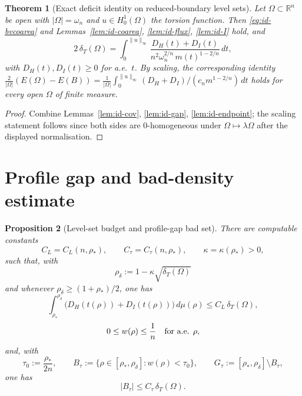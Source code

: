 \documentclass[11pt]{amsart}
\newtheorem{theorem}{Theorem}[section]
\newtheorem{proposition}[theorem]{Proposition}
\theoremstyle{definition}
\newcommand{\R}{\mathbb R}
\newcommand{\Om}{\Omega}
\newcommand{\dT}{\delta_T}
\newcommand{\rstar}{\rho_*}
\newcommand{\rdel}{\rho_\delta}
\newcommand{\wt}{w}
\begin{document}
\begin{theorem}[Exact deficit identity on reduced-boundary level sets]
\label{thm:id-main}
Let \(\Om\subset\R^n\) be open with \(|\Om|=\omega_n\) and \(u\in H^1_0(\Om)\)
the torsion function.  Then \eqref{eq:id-bvcoarea} and
Lemmas~\ref{lem:id-coarea}, \ref{lem:id-flux}, \ref{lem:id-I} hold, and
\begin{equation}\label{eq:id-main}
   \boxed{\;
   2\,\dT(\Om)
   =\int_0^{\|u\|_\infty}
      \frac{D_H(t)+D_I(t)}{n^2\omega_n^{2/n}\,m(t)^{1-2/n}}\,dt ,\;}
\end{equation}
with \(D_H(t),D_I(t)\ge0\) for a.e.\ \(t\).  By scaling, the corresponding
identity \(\tfrac{2}{|\Om|}(E(\Om)-E(B))=\tfrac1{|\Om|}\int_0^{\|u\|_\infty}
(D_H+D_I)/(c_n m^{1-2/n})\,dt\) holds for every open \(\Om\) of finite measure.
\end{theorem}

\begin{proof}
Combine Lemmas~\ref{lem:id-cov}, \ref{lem:id-gap}, \ref{lem:id-endpoint}; the
scaling statement follows since both sides are \(0\)-homogeneous under
\(\Om\mapsto\lambda\Om\) after the displayed normalisation.
\end{proof}

\section{Profile gap and bad-density estimate}\label{sec:profilegap}

\begin{proposition}[Level-set budget and profile-gap bad set]
\label{prop:levelset}
There are computable constants
\[
   C_L=C_L(n,\rstar),\qquad C_\tau=C_\tau(n,\rstar),
   \qquad \kappa=\kappa(\rstar)>0,
\]
such that, with
\[
   \rdel:=1-\kappa\sqrt{\dT(\Om)}
\]
and whenever \(\rdel\ge(1+\rstar)/2\), one has
\begin{equation}\label{eq:budget}
   \int_{\rstar}^{\rdel}
      \bigl(D_H(t(\rho))+D_I(t(\rho))\bigr)\,d\mu(\rho)
   \le C_L\,\dT(\Om),
\end{equation}
\[
   0\le \wt(\rho)\le\frac1n\quad\hbox{for a.e. }\rho,
\]
and, with
\[
   \tau_0:=\frac{\rstar}{2n},\qquad
   B_\tau:=\{\rho\in[\rstar,\rdel]:\wt(\rho)<\tau_0\},\qquad
   G_\tau:=[\rstar,\rdel]\setminus B_\tau,
\]
one has
\begin{equation}\label{eq:badtau}
   |B_\tau|\le C_\tau\,\dT(\Om).
\end{equation}
\end{proposition}
\end{document}

